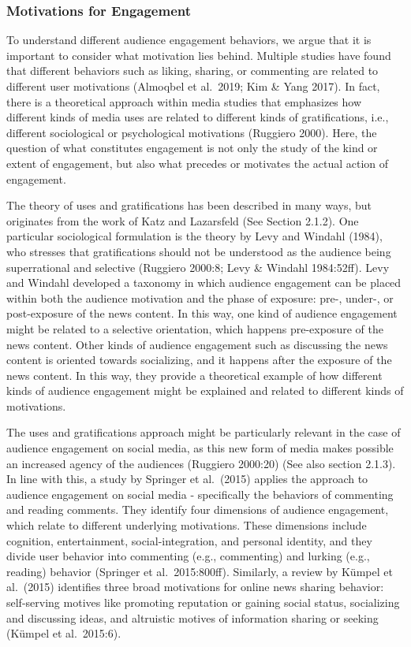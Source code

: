 \documentclass[
]{article}
\begin{document}
\hypertarget{motivations-for-engagement}{%
\subsubsection{Motivations for
Engagement}\label{motivations-for-engagement}}

\noindent To understand different audience engagement behaviors, we
argue that it is important to consider what motivation lies behind.
Multiple studies have found that different behaviors such as liking,
sharing, or commenting are related to different user motivations
(Almoqbel et al.~2019; Kim \& Yang 2017). In fact, there is a
theoretical approach within media studies that emphasizes how different
kinds of media uses are related to different kinds of gratifications,
i.e., different sociological or psychological motivations (Ruggiero
2000). Here, the question of what constitutes engagement is not only the
study of the kind or extent of engagement, but also what precedes or
motivates the actual action of engagement.

The theory of uses and gratifications has been described in many ways,
but originates from the work of Katz and Lazarsfeld (See Section 2.1.2).
One particular sociological formulation is the theory by Levy and
Windahl (1984), who stresses that gratifications should not be
understood as the audience being superrational and selective (Ruggiero
2000:8; Levy \& Windahl 1984:52ff). Levy and Windahl developed a
taxonomy in which audience engagement can be placed within both the
audience motivation and the phase of exposure: pre-, under-, or
post-exposure of the news content. In this way, one kind of audience
engagement might be related to a selective orientation, which happens
pre-exposure of the news content. Other kinds of audience engagement
such as discussing the news content is oriented towards socializing, and
it happens after the exposure of the news content. In this way, they
provide a theoretical example of how different kinds of audience
engagement might be explained and related to different kinds of
motivations.

The uses and gratifications approach might be particularly relevant in
the case of audience engagement on social media, as this new form of
media makes possible an increased agency of the audiences (Ruggiero
2000:20) (See also section 2.1.3). In line with this, a study by
Springer et al.~(2015) applies the approach to audience engagement on
social media - specifically the behaviors of commenting and reading
comments. They identify four dimensions of audience engagement, which
relate to different underlying motivations. These dimensions include
cognition, entertainment, social-integration, and personal identity, and
they divide user behavior into commenting (e.g., commenting) and lurking
(e.g., reading) behavior (Springer et al.~2015:800ff). Similarly, a
review by Kümpel et al.~(2015) identifies three broad motivations for
online news sharing behavior: self-serving motives like promoting
reputation or gaining social status, socializing and discussing ideas,
and altruistic motives of information sharing or seeking (Kümpel et
al.~2015:6).
\end{document}
